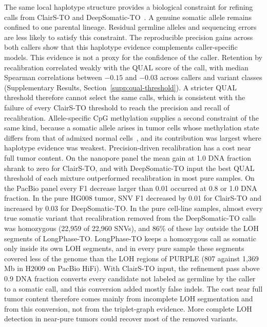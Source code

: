 \documentclass[unnumsec,webpdf,contemporary,large]{oup-authoring-template}
\begin{document}
The same local haplotype structure provides a biological constraint for refining calls from ClairS-TO and DeepSomatic-TO~\cite{park2024,chen2025}. A genuine somatic allele remains confined to one parental lineage. Residual germline alleles and sequencing errors are less likely to satisfy this constraint. The reproducible precision gains across both callers show that this haplotype evidence complements caller-specific models. This evidence is not a proxy for the confidence of the caller. Retention by recalibration correlated weakly with the QUAL score of the call, with median Spearman correlations between $-0.15$ and $-0.03$ across callers and variant classes (Supplementary Results, Section~\ref{supp:qual-threshold}). A stricter QUAL threshold therefore cannot select the same calls, which is consistent with the failure of every ClairS-TO threshold to reach the precision and recall of recalibration. Allele-specific CpG methylation supplies a second constraint of the same kind, because a somatic allele arises in tumor cells whose methylation state differs from that of admixed normal cells~\cite{recillastarga2022,zheng2017,zhang2015}, and its contribution was largest where haplotype evidence was weakest. Precision-driven recalibration has a cost near full tumor content. On the nanopore panel the mean gain at 1.0 DNA fraction shrank to zero for ClairS-TO, and with DeepSomatic-TO input the best QUAL threshold of each mixture outperformed recalibration in most pure samples. On the PacBio panel every F1 decrease larger than 0.01 occurred at 0.8 or 1.0 DNA fraction. In the pure HG008 tumor, SNV F1 decreased by 0.01 for ClairS-TO and increased by 0.03 for DeepSomatic-TO. In the pure cell-line samples, almost every true somatic variant that recalibration removed from the DeepSomatic-TO calls was homozygous (22,959 of 22,960 SNVs), and 86\% of these lay outside the LOH segments of LongPhase-TO. LongPhase-TO keeps a homozygous call as somatic only inside its own LOH segments, and in every pure sample these segments covered less of the genome than the LOH regions of PURPLE (807 against 1,369 Mb in H2009 on PacBio HiFi). With ClairS-TO input, the refinement pass above 0.9 DNA fraction converts every candidate not labeled as germline by the caller to a somatic call, and this conversion added mostly false indels. The cost near full tumor content therefore comes mainly from incomplete LOH segmentation and from this conversion, not from the triplet-graph evidence. More complete LOH detection in near-pure tumors could recover most of the removed variants.
\end{document}
